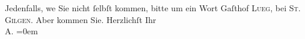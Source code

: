 \begin{ledgroupsized}[t]{13cm}
           \pstart
           Jedenfalls, we{\geminationn} Sie nicht ſelbſt kommen, bitte um ein
               Wort Gaſthof \textsc{Lueg}, bei \textsc{St. Gilgen}.\pend
           \pstart
           Aber kommen Sie.\pend
           \pstart
           Herzlichſt Ihr{\\[\baselineskip]}\spacefill\mbox{A.}\pend
           \leftskip=0em{}
         
         \endnumbering{}\end{ledgroupsized}  \newcommand{\dateiname}{L01435}\newcommand{\titel}{Arthur Schnitzler an Richard Beer-Hofmann, 3. 9. 1904}\newcommand{\editorInnen}{Martin Anton Müller und Gerd-Hermann Susen}
      
